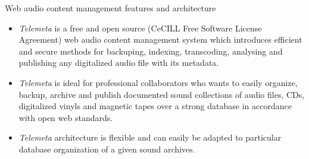 \documentclass[final, hyperref, table]{beamer}
\begin{document}
\begin{frame}[containsverbatim]{}
  \begin{columns}[T]
    \footnotesize
    \begin{column}[T]{.49\linewidth}
        
 

      \begin{block}{Web audio content management features and architecture}
        \vspace{-0.5cm}  
        \begin{itemize}
        \item \emph{Telemeta} is a free and open source ({\scriptsize CeCILL
            Free Software License Agreement}) web audio content management
          system which introduces efficient and secure methods for
          \alert{backuping}, \alert{indexing}, \alert{transcoding}, \alert{analysing} and \alert{publishing} any
          digitalized audio file with its metadata.
        \item \emph{Telemeta} is ideal for
          professional collaborators who wants to easily organize, backup, archive and
          publish documented sound collections of audio files, CDs,
          digitalized vinyls and magnetic tapes over a strong database in
          accordance with \alert{open web standards}.
        \item \emph{Telemeta} architecture
          is \alert{flexible} and can easily be adapted to particular database
          organization of a given sound archives.
        \end{itemize}
        

\end{block}
\end{column}
\end{columns}
\end{frame}
\end{document}
